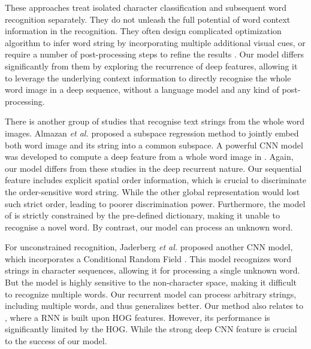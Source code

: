 \documentclass[letterpaper]{article}
\begin{document}
These approaches treat isolated character classification and subsequent word recognition separately. They do not unleash the full potential of word context information in the recognition. They often design complicated optimization algorithm to infer word string by incorporating multiple additional visual cues, or require a number of post-processing steps to refine the results \cite{Jaderberg2014,Bissacco2013}. Our model differs significantly from them by exploring the recurrence of deep features, allowing it to leverage the underlying context information to directly recognise the whole word image in a deep sequence, without a language model and any kind of post-processing.


There is another group of studies that recognise text strings from the whole word images. Almazan \emph{et al.} \cite{Almazan2014} proposed a subspace regression method to jointly embed both word image and its string into a common subspace.
 A powerful CNN model was developed to compute a deep feature from a whole word image in \cite{Jaderberg2015b}. Again, our model differs from these studies in the deep recurrent nature. Our  sequential feature includes explicit spatial order information, which is crucial to discriminate the order-sensitive word string. While the other global representation would lost such strict order, leading to poorer discrimination power. Furthermore, the model of \cite{Jaderberg2015b} is strictly constrained by the pre-defined dictionary, making it unable to recognise a novel word. By contrast, our model can process an unknown word. %

For unconstrained recognition, Jaderberg \emph{et al.} proposed another CNN model, which incorporates a Conditional Random Field \cite{Jaderberg2015a}. This model recognizes word strings in character sequences, allowing it for processing a single unknown word. But the model is highly sensitive to the non-character space, making it difficult to recognize multiple words.
 Our recurrent model can process arbitrary strings, including multiple words, and thus generalizes better.
 Our method also relates to \cite{Su2014}, where a RNN is built upon HOG features. However, its performance is significantly limited by the HOG.
  While the strong deep CNN feature is crucial to the success of our model.
\end{document}

